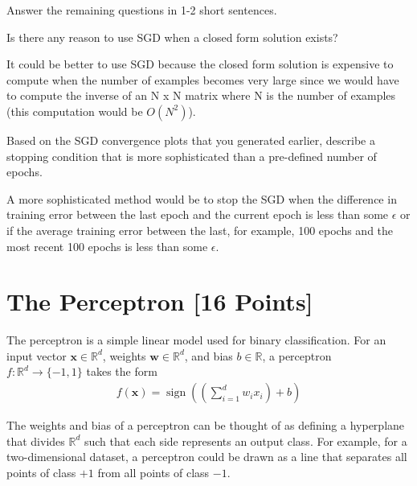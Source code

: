 Answer the remaining questions in 1-2 short sentences.

\begin{problem}[2]
  Is there any reason to use SGD when a closed form solution exists?
\end{problem}
\begin{solution}
  It could be better to use SGD because the closed form solution is expensive to compute when the number of examples becomes very large since we would have to compute the inverse of an N x N matrix where N is the number of examples (this computation would be $O(N^2)$).
\end{solution}

\begin{problem}[2]
  Based on the SGD convergence plots that you generated earlier, describe a stopping condition that is more sophisticated than a pre-defined number of epochs.
\end{problem}
\begin{solution}
  A more sophisticated method would be to stop the SGD when the difference in training error between the last epoch and the current epoch is less than some $\epsilon$ or if the average training error between the last, for example, 100 epochs and the most recent 100 epochs is less than some $\epsilon$. 
\end{solution}



\newpage
\section{The Perceptron [16 Points]}

The perceptron is a simple linear model used for binary classification. For an input vector $\mathbf{x} \in \mathbb{R}^d$, weights $\mathbf{w} \in \mathbb{R}^d$, and bias $b \in \mathbb{R}$, a perceptron $f: \mathbb{R}^d \rightarrow \{-1,1\}$ takes the form
\begin{align*}
  f(\mathbf{x}) = \operatorname{sign}\left(\left(\sum_{i=1}^d w_i x_i\right) + b \right)
\end{align*}

The weights and bias of a perceptron can be thought of as defining a hyperplane that divides $\mathbb{R}^d$ such that each side represents an output class. For example, for a two-dimensional dataset, a perceptron could be drawn as a line that separates all points of class $+1$ from all points of class $-1$.

